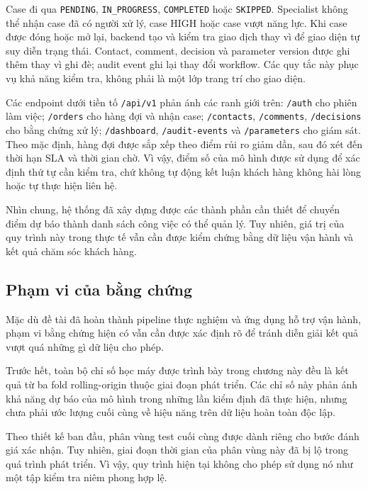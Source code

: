 \documentclass[12pt,a4paper]{report}
\begin{document}
Case đi qua \texttt{PENDING}, \texttt{IN\_PROGRESS}, \texttt{COMPLETED} hoặc \texttt{SKIPPED}. Specialist không thể nhận case đã có người xử lý, case HIGH hoặc case vượt năng lực. Khi case được đóng hoặc mở lại, backend tạo và kiểm tra giao dịch thay vì để giao diện tự suy diễn trạng thái. Contact, comment, decision và parameter version được ghi thêm thay vì ghi đè; audit event ghi lại thay đổi workflow. Các quy tắc này phục vụ khả năng kiểm tra, không phải là một lớp trang trí cho giao diện.

Các endpoint dưới tiền tố \texttt{/api/v1} phản ánh các ranh giới trên: \texttt{/auth} cho phiên làm việc; \texttt{/orders} cho hàng đợi và nhận case; \texttt{/contacts}, \texttt{/comments}, \texttt{/decisions} cho bằng chứng xử lý; \texttt{/dashboard}, \texttt{/audit-events} và \texttt{/parameters} cho giám sát. Theo mặc định, hàng đợi được sắp xếp theo điểm rủi ro giảm dần, sau đó xét đến thời hạn SLA và thời gian chờ. Vì vậy, điểm số của mô hình được sử dụng để xác định thứ tự cần kiểm tra, chứ không tự động kết luận khách hàng không hài lòng hoặc tự thực hiện liên hệ.

Nhìn chung, hệ thống đã xây dựng được các thành phần cần thiết để chuyển điểm dự báo thành danh sách công việc có thể quản lý. Tuy nhiên, giá trị của quy trình này trong thực tế vẫn cần được kiểm chứng bằng dữ liệu vận hành và kết quả chăm sóc khách hàng.

\subsection{Phạm vi của bằng chứng}\label{subsec:res-scope}

Mặc dù đề tài đã hoàn thành pipeline thực nghiệm và ứng dụng hỗ trợ vận hành, phạm vi bằng chứng hiện có vẫn cần được xác định rõ để tránh diễn giải kết quả vượt quá những gì dữ liệu cho phép.

Trước hết, toàn bộ chỉ số học máy được trình bày trong chương này đều là kết quả từ ba fold rolling-origin thuộc giai đoạn phát triển. Các chỉ số này phản ánh khả năng dự báo của mô hình trong những lần kiểm định đã thực hiện, nhưng chưa phải ước lượng cuối cùng về hiệu năng trên dữ liệu hoàn toàn độc lập.

Theo thiết kế ban đầu, phân vùng test cuối cùng được dành riêng cho bước đánh giá xác nhận. Tuy nhiên, giai đoạn thời gian của phân vùng này đã bị lộ trong quá trình phát triển. Vì vậy, quy trình hiện tại không cho phép sử dụng nó như một tập kiểm tra niêm phong hợp lệ.
\end{document}
